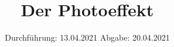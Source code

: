 

\subject{Versuch Nr.500}
\title{Der Photoeffekt}
\date{%
  Durchführung: 13.04.2021
  \hspace{3em}
  Abgabe: 20.04.2021
}



\maketitle
\thispagestyle{empty}
\tableofcontents
\newpage 








\nocite{*}

\printbibliography{}


